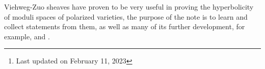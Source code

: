 \documentclass[a4paper, twoside]{article}
\title{\tbf{Viehweg-Zuo sheaves}}
\author{\tbf{Notes} by Cong Wen, 02/2023}
\date{}
\begin{document}
\maketitle
\thispagestyle{empty}
\begin{abstract}
	This is my self-use notes\footnote{Last updated on February 11, 2023} on  with main referecens\cite{VZ2001,VZ2002,VZ2003}. All possible faults and immature writting are on my own. Please reach out if you find anything incorrect.

\end{abstract}
\tableofcontents

Viehweg-Zuo sheaves have proven to be very useful in proving the hyperbolicity of moduli spaces of polarized varieties, the purpose of the note is to learn and collect statements from them, as well as many of its further development, for example, \cite{CP2015} and \cite{PS2017}.








\end{document}
